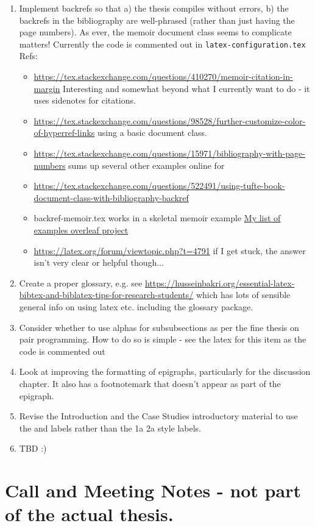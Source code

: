 \begin{enumerate}
    \item Implement backrefs so that a) the thesis compiles without errors, b) the backrefs in the bibliography are well-phrased (rather than just having the page numbers). As ever, the memoir document class seems to complicate matters! Currently the code is commented out in \texttt{latex-configuration.tex} Refs:
    \begin{itemize}
        \item \url{https://tex.stackexchange.com/questions/410270/memoir-citation-in-margin} Interesting and somewhat beyond what I currently want to do - it uses sidenotes for citations.
        \item \url{https://tex.stackexchange.com/questions/98528/further-customize-color-of-hyperref-links} using a basic document class.
        \item \url{https://tex.stackexchange.com/questions/15971/bibliography-with-page-numbers} sums up several other examples online for 
        \item \url{https://tex.stackexchange.com/questions/522491/using-tufte-book-document-class-with-bibliography-backref}
        \item backref-memoir.tex works in a skeletal memoir example \href{https://www.overleaf.com/project/612fb5e6f6cc44c10b56afa1}{My list of examples overleaf project}
        \item \url{https://latex.org/forum/viewtopic.php?t=4791} if I get stuck, the answer isn't very clear or helpful though...
    \end{itemize}
    
    \item Create a proper glossary, e.g. see \url{https://husseinbakri.org/essential-latex-bibtex-and-biblatex-tips-for-research-students/} which has lots of sensible general info on using latex etc. including the glossary package.
    
    \item Consider whether to use alphas for subsubsections as per the fine thesis on pair programming. How to do so is simple - see the latex for this item as the code is commented out %
    
    \item Look at improving the formatting of epigraphs, particularly for the discussion chapter. It also has a footnotemark that doesn't appear as part of the epigraph.
    
    \item Revise the Introduction and the Case Studies introductory material to use the \uuse and \iuse labels rather than the 1a 2a style labels.
    
    \item TBD :)
    
\end{enumerate}

\clearpage
\section{Call and Meeting Notes - not part of the actual thesis.}
